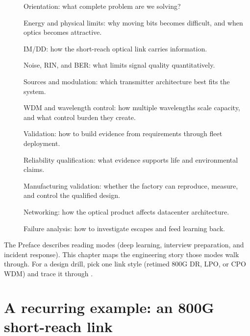 \begin{description}
\item[] Orientation: what complete problem are we solving?
\item[] Energy and physical limits: why moving bits
      becomes difficult, and when optics becomes attractive.
\item[] IM/DD: how the short-reach optical link carries
      information.
\item[] Noise, RIN, and BER: what limits signal quality
      quantitatively.
\item[] Sources and modulation: which transmitter architecture
      best fits the system.
\item[] WDM and wavelength control: how multiple wavelengths scale
      capacity, and what control burden they create.
\item[] Validation: how to build evidence from requirements
      through fleet deployment.
\item[] Reliability qualification: what evidence supports
      life and environmental claims.
\item[] Manufacturing validation: whether the factory can
      reproduce, measure, and control the qualified design.
\item[] Networking: how the optical product affects
      datacenter architecture.
\item[] Failure analysis: how to investigate escapes and
      feed learning back.
\end{description}

The Preface describes reading modes (deep learning, interview preparation, and
incident response). This chapter maps the engineering story those modes walk
through. For a design drill, pick one link style (retimed 800G DR, LPO, or CPO
WDM) and trace it through .

\section{A recurring example: an 800G short-reach link}

